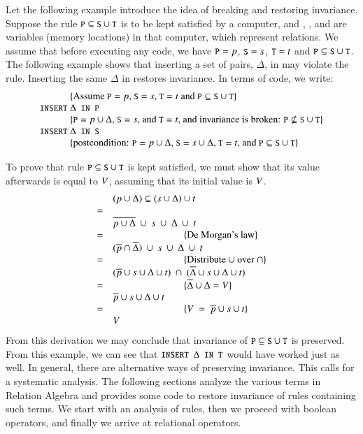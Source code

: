 \documentclass{elsarticle}
\begin{document}
	Let the following example introduce the idea of breaking and restoring invariance.
	Suppose the rule $\text{\tt\small P}\subseteq\text{\tt\small S}\cup\text{\tt\small T}$ is to be kept satisfied by a computer,
	and , , and  are variables (memory locations) in that computer,
	which represent relations.
	We assume that before executing any code, we have $\text{\tt\small P}=p$, $\text{\tt\small S}=s$, $\text{\tt\small T}=t$ and $\text{\tt\small P}\subseteq\text{\tt\small S}\cup\text{\tt\small T}$.
	The following example shows that inserting a set of pairs, $\Delta$, in 
	may violate the rule.
	Inserting the same $\Delta$ in  restores invariance.
	In terms of code, we write:
\[\begin{array}{r@{~}l}
&\{\text{Assume $\code{P}=p$, $\code{S}=s$, $\code{T}=t$ and $\code{P}\subs\code{S}\cup\code{T}$}\}\\
\code{INSERT}&\Delta\code{ IN P}\\
&\{\text{$\code{P}=p\cup\Delta$, $\code{S}=s$, and $\code{T}=t$, and invariance is broken: $\code{P}\not\subs\code{S}\cup\code{T}$}\}\\
\code{INSERT}&\Delta\code{ IN S}\\
&\{\text{postcondition: $\code{P}=p\cup\Delta$, $\code{S}=s\cup\Delta$, $\code{T}=t$, and $\code{P}\subs\code{S}\cup\code{T}$}\}\\
\end{array}\]
	
	To prove that rule $\text{\tt\small P}\subseteq\text{\tt\small S}\cup\text{\tt\small T}$ is kept satisfied,
	we must show that its value afterwards is equal to $V$,
	assuming that its initial value is $V$.
\[\begin{array}{cl}
&(p\cup\Delta)\subseteq(s\cup\Delta)\cup t\\
=&\\
&\overline{p\cup\Delta}\ \cup\ s\ \cup\ \Delta\ \cup\ t\\
=&\hspace{1in}\{\hbox{De Morgan's law}\}\\
&(\overline{p}\cap\overline{\Delta})\ \cup\ s\ \cup\ \Delta\ \cup\ t\\
=&\hspace{1in}\{\hbox{Distribute $\cup$ over $\cap$}\}\\
&(\overline{p}\cup s\cup\Delta\cup t)\ \cap\ (\overline{\Delta}\cup s\cup\Delta\cup t)\\
=&\hspace{1in}\{\overline{\Delta}\cup\Delta=V\}\\
&\overline{p}\cup s\cup\Delta\cup t\\
=&\hspace{1in}\{V\ =\ \overline{p}\cup s\cup t\}\\
&V
\end{array}\]
	From this derivation we may conclude that invariance of $\text{\tt\small P}\subseteq\text{\tt\small S}\cup\text{\tt\small T}$ is preserved.
	From this example, we can see that $\code{INSERT }\Delta\code{ IN T}$ would have worked just as well.
	In general, there are alternative ways of preserving invariance.
	This calls for a systematic analysis.
	The following sections analyze the various terms in Relation Algebra and provides some code to restore invariance of rules containing such terms.
	We start with an analysis of rules, then we proceed with boolean operators, and finally we arrive at relational operators.
\end{document}
